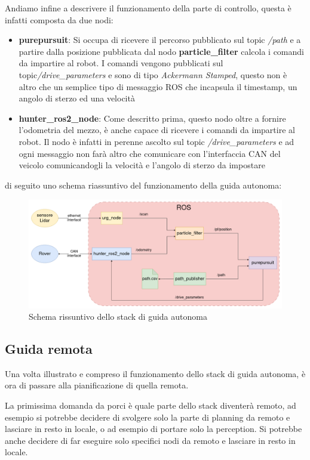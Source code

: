 \noindent Andiamo infine a descrivere il funzionamento della parte di controllo, questa è infatti composta da due nodi:

\begin{itemize}
  \item \textbf{purepursuit}: Si occupa di ricevere il percorso pubblicato sul topic \textit{/path} e a partire dalla posizione pubblicata dal nodo \textbf{particle\_filter} calcola i comandi da impartire al robot. I comandi vengono pubblicati sul topic\textit{/drive\_parameters} e sono di tipo \textit{Ackermann Stamped}, questo non è altro che un semplice tipo di messaggio ROS che incapsula il timestamp, un angolo di sterzo ed una velocità
  \item \textbf{hunter\_ros2\_node}: Come descritto prima, questo nodo oltre a fornire l'odometria del mezzo, è anche capace di ricevere i comandi da impartire al robot. Il nodo è infatti in perenne ascolto sul topic \textit{/drive\_parameters} e ad ogni messaggio non farà altro che comunicare con l'interfaccia CAN del veicolo comunicandogli la velocità e l'angolo di sterzo da impostare
\end{itemize}

\noindent di seguito uno schema riassuntivo del funzionamento della guida autonoma:
\begin{figure}[h]
  \centering
  \includegraphics[width=1\textwidth]{figures/schema_guida_autonoma.png}
  \caption{Schema rissuntivo dello stack di guida autonoma}
  \label{Schema rissuntivo dello stack di guida autonoma}
\end{figure}

\subsection{Guida remota}
Una volta illustrato e compreso il funzionamento dello stack di guida autonoma, è ora di passare alla pianificazione di quella remota.

\noindent La primissima domanda da porci è quale parte dello stack diventerà remoto, ad esempio si potrebbe decidere di svolgere solo la parte di planning da remoto e lasciare in resto in locale, o ad esempio di portare solo la perception. Si potrebbe anche decidere di far eseguire solo specifici nodi da remoto e lasciare in resto in locale.

